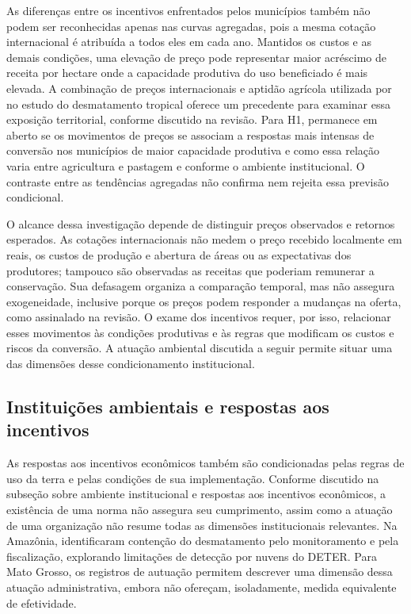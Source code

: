 As diferenças entre os incentivos enfrentados pelos municípios também não podem ser reconhecidas apenas nas curvas agregadas, pois a mesma cotação internacional é atribuída a todos eles em cada ano. Mantidos os custos e as demais condições, uma elevação de preço pode representar maior acréscimo de receita por hectare onde a capacidade produtiva do uso beneficiado é mais elevada. A combinação de preços internacionais e aptidão agrícola utilizada por  no estudo do desmatamento tropical oferece um precedente para examinar essa exposição territorial, conforme discutido na revisão. Para H1, permanece em aberto se os movimentos de preços se associam a respostas mais intensas de conversão nos municípios de maior capacidade produtiva e como essa relação varia entre agricultura e pastagem e conforme o ambiente institucional. O contraste entre as tendências agregadas não confirma nem rejeita essa previsão condicional.

O alcance dessa investigação depende de distinguir preços observados e retornos esperados. As cotações internacionais não medem o preço recebido localmente em reais, os custos de produção e abertura de áreas ou as expectativas dos produtores; tampouco são observadas as receitas que poderiam remunerar a conservação. Sua defasagem organiza a comparação temporal, mas não assegura exogeneidade, inclusive porque os preços podem responder a mudanças na oferta, como assinalado na revisão. O exame dos incentivos requer, por isso, relacionar esses movimentos às condições produtivas e às regras que modificam os custos e riscos da conversão. A atuação ambiental discutida a seguir permite situar uma das dimensões desse condicionamento institucional.

\FloatBarrier
\subsection{Instituições ambientais e respostas aos incentivos}
\label{subsec:mt-instituicoes}

As respostas aos incentivos econômicos também são condicionadas pelas regras de uso da terra e pelas condições de sua implementação. Conforme discutido na subseção sobre ambiente institucional e respostas aos incentivos econômicos, a existência de uma norma não assegura seu cumprimento, assim como a atuação de uma organização não resume todas as dimensões institucionais relevantes. Na Amazônia,  identificaram contenção do desmatamento pelo monitoramento e pela fiscalização, explorando limitações de detecção por nuvens do DETER. Para Mato Grosso, os registros de autuação permitem descrever uma dimensão dessa atuação administrativa, embora não ofereçam, isoladamente, medida equivalente de efetividade.

